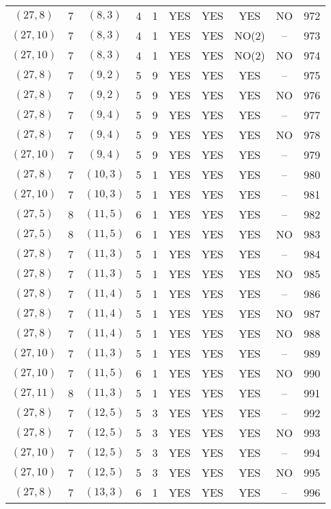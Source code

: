 \begin{longtable}{|c|c|c|c|c|c|c|c|c|c|}
$(27, 8)$ & 7 & $(8, 3)$ & 4 & 1 & YES & YES & YES & NO & 972\\
$(27, 10)$ & 7 & $(8, 3)$ & 4 & 1 & YES & YES & NO(2) & -- & 973\\
$(27, 10)$ & 7 & $(8, 3)$ & 4 & 1 & YES & YES & NO(2) & NO & 974\\
$(27, 8)$ & 7 & $(9, 2)$ & 5 & 9 & YES & YES & YES & -- & 975\\
$(27, 8)$ & 7 & $(9, 2)$ & 5 & 9 & YES & YES & YES & NO & 976\\
$(27, 8)$ & 7 & $(9, 4)$ & 5 & 9 & YES & YES & YES & -- & 977\\
$(27, 8)$ & 7 & $(9, 4)$ & 5 & 9 & YES & YES & YES & NO & 978\\
$(27, 10)$ & 7 & $(9, 4)$ & 5 & 9 & YES & YES & YES & -- & 979\\
$(27, 8)$ & 7 & $(10, 3)$ & 5 & 1 & YES & YES & YES & -- & 980\\
$(27, 10)$ & 7 & $(10, 3)$ & 5 & 1 & YES & YES & YES & -- & 981\\
$(27, 5)$ & 8 & $(11, 5)$ & 6 & 1 & YES & YES & YES & -- & 982\\
$(27, 5)$ & 8 & $(11, 5)$ & 6 & 1 & YES & YES & YES & NO & 983\\
$(27, 8)$ & 7 & $(11, 3)$ & 5 & 1 & YES & YES & YES & -- & 984\\
$(27, 8)$ & 7 & $(11, 3)$ & 5 & 1 & YES & YES & YES & NO & 985\\
$(27, 8)$ & 7 & $(11, 4)$ & 5 & 1 & YES & YES & YES & -- & 986\\
$(27, 8)$ & 7 & $(11, 4)$ & 5 & 1 & YES & YES & YES & NO & 987\\
$(27, 8)$ & 7 & $(11, 4)$ & 5 & 1 & YES & YES & YES & NO & 988\\
$(27, 10)$ & 7 & $(11, 3)$ & 5 & 1 & YES & YES & YES & -- & 989\\
$(27, 10)$ & 7 & $(11, 5)$ & 6 & 1 & YES & YES & YES & NO & 990\\
$(27, 11)$ & 8 & $(11, 3)$ & 5 & 1 & YES & YES & YES & -- & 991\\
$(27, 8)$ & 7 & $(12, 5)$ & 5 & 3 & YES & YES & YES & -- & 992\\
$(27, 8)$ & 7 & $(12, 5)$ & 5 & 3 & YES & YES & YES & NO & 993\\
$(27, 10)$ & 7 & $(12, 5)$ & 5 & 3 & YES & YES & YES & -- & 994\\
$(27, 10)$ & 7 & $(12, 5)$ & 5 & 3 & YES & YES & YES & NO & 995\\
$(27, 8)$ & 7 & $(13, 3)$ & 6 & 1 & YES & YES & YES & -- & 996\\

\end{longtable}
